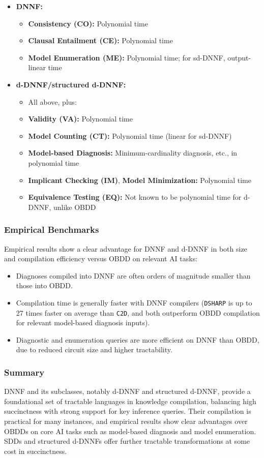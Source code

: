 \begin{itemize}
    \item \textbf{DNNF:}
    \begin{itemize}
        \item \textbf{Consistency (CO):} Polynomial time
        \item \textbf{Clausal Entailment (CE):} Polynomial time
        \item \textbf{Model Enumeration (ME):} Polynomial time; for sd-DNNF, output-linear time
    \end{itemize}
    \item \textbf{d-DNNF/structured d-DNNF:}
    \begin{itemize}
        \item All above, plus:
        \item \textbf{Validity (VA):} Polynomial time
        \item \textbf{Model Counting (CT):} Polynomial time (linear for sd-DNNF)
        \item \textbf{Model-based Diagnosis:} Minimum-cardinality diagnosis, etc., in polynomial time
        \item \textbf{Implicant Checking (IM)}, \textbf{Model Minimization:} Polynomial time
        \item \textbf{Equivalence Testing (EQ):} Not known to be polynomial time for d-DNNF, unlike OBDD
    \end{itemize}
\end{itemize}

\subsubsection{Empirical Benchmarks}
Empirical results show a clear advantage for DNNF and d-DNNF in both size and compilation efficiency versus OBDD on relevant AI tasks:
\begin{itemize}
    \item Diagnoses compiled into DNNF are often orders of magnitude smaller than those into OBDD.
    \item Compilation time is generally faster with DNNF compilers (\texttt{DSHARP} is up to 27 times faster on average than \texttt{C2D}, and both outperform OBDD compilation for relevant model-based diagnosis inputs).
    \item Diagnostic and enumeration queries are more efficient on DNNF than OBDD, due to reduced circuit size and higher tractability.
\end{itemize}

\subsubsection{Summary}
DNNF and its subclasses, notably d-DNNF and structured d-DNNF, provide a foundational set of tractable languages in knowledge compilation, balancing high succinctness with strong support for key inference queries. Their compilation is practical for many instances, and empirical results show clear advantages over OBDDs on core AI tasks such as model-based diagnosis and model enumeration. SDDs and structured d-DNNFs offer further tractable transformations at some cost in succinctness.